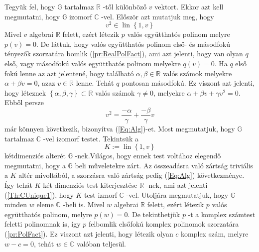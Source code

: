 \documentclass[9pt, showtrims]{memoir}
\makeatletter
\renewenvironment{proof}[1][\proofname]
    {\par\pushQED{\qed}%
    \normalfont \topsep6\p@\@plus6\p@\relax
    \trivlist
    \item[\hskip\labelsep
        \itshape
    #1\@addpunct{:}]\ignorespaces}
    {\popQED\endtrivlist\@endpefalse}
\theoremstyle{plain}
\theoremstyle{remark}
\theoremstyle{definition}
\makeatother
\begin{document}
\begin{proof}
Tegyük fel, hogy $\mathbb{G}$ tartalmaz $\mathbb{R}$ -től különböző $v$ vektort.
Ekkor azt kell megmutatni, hogy $\mathbb{G}$ izomorf $\mathbb{C}$ -vel.\newline
Először azt mutatjuk meg, hogy 
\begin{equation}
v^{2}\in \operatorname{lin}\left\{ 1,v\right\} 
\end{equation}
\label{Eq:Alg}Mivel $v$ algebrai $\mathbb{R}$ felett, ezért létezik $p$
valós együtthatós polinom melyre $p\left( v\right) =0$.
De láttuk, hogy valós együtthatós polinom első- és másodfokú tényezők szorzatára bomlik (\ref{pr:RealPolFact}),
ami azt jelenti, hogy van olyan $q$ első, vagy másodfokú valós együtthatós polinom melyekre $q\left( v\right) =0$.
Ha $q$ első
fokú lenne az azt jelentené, hogy található $\alpha ,\beta
\in \mathbb{R}$ valós számok melyekre $\alpha +\beta v=0$, azaz $v\in \mathbb{R}$ lenne.
Tehát $q$ pontosan másodfokú.
Ez viszont azt
jelenti, hogy léteznek $\left\{ \alpha ,\beta ,\gamma \right\} \subset 
\mathbb{R}$ valós számok $\gamma \neq 0$, melyekre $\alpha +\beta
v+\gamma v^{2}=0$.
Ebből persze 
\[
v^{2}=\frac{-\alpha }{\gamma }+\frac{-\beta }{\gamma }v
\]
már könnyen következik, bizonyítva (\ref{Eq:Alg})-et.\newline
Most megmutatjuk, hogy $\mathbb{G}$ tartalmaz $\mathbb{C}$ -vel izomorf testet.
Tekintsük a 
\[
K:=\operatorname{lin}\left\{ 1,v\right\} 
\]
kétdimenziós alterét $\mathbb{G}$ -nek.Világos, hogy ennek test
voltához elegendő megmutatni, hogy a $\mathbb{G}$ beli műveletekre zárt.
Az összeadásra való zártság triviális a $K$
altér mivoltából, a szorzásra való zártság pedig
(\ref{Eq:Alg}) következménye.
\'{I}gy tehát $K$ két dimenziós test kiterjesztése $\mathbb{R}$ -nek, ami azt jelenti (\ref{Th:CUnique1}), 
hogy $K$ test izmorf $\mathbb{C}$ -vel.\newline
Utoljára megmutatjuk, hogy $\mathbb{G}$ minden $w$ eleme $\mathbb{C}$ -beli
is.
Mivel $w$ algebrai $\mathbb{R}$ felett, ezért létezik $p$ valós együtthatós polinom, melyre $p\left( w\right) =0$.
De tekinthetjük $p$ -t a komplex számtest feletti polinomnak is, így $p$
felbomlik elsőfokú komplex polinomok szorzatára (\ref{pr:PolFact}).
Ez viszont azt jelenti, hogy létezik olyan $c$ komplex szám,
melyre $w-c=0$, tehát $w\in \mathbb{C}$ valóban teljesül.
\end{proof}

\backmatter
\pagestyle{empty}
%
\printbibliography
\printindex
\end{document}
